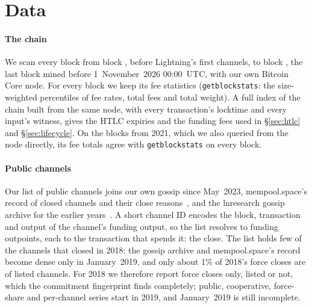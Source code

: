 \section{Data}
\label{sec:data}

\paragraph{The chain}
We scan every block from block \ScanStartHeight{}, before Lightning's first channels, to block \CutoffHeight{}, the last
block mined before 1~November~2026 00:00~UTC, with our own Bitcoin Core node. For every block we keep its fee
statistics (\texttt{getblockstats}: the size-weighted percentiles of fee rates, total fees and total weight). A full
index of the chain built from the same node, with every transaction's locktime and every input's witness, gives the
HTLC expiries and the funding fees used in \S\ref{sec:htlc} and \S\ref{sec:lifecycle}.
On the blocks from 2021, which we also queried from the node directly, its fee totals agree with
\texttt{getblockstats} on every block.

\paragraph{Public channels}
Our list of public channels joins our own gossip since May~2023, mempool.space's record of closed channels and their
close reasons~\cite{mempoolspace}, and the lnresearch gossip archive for the earlier
years~\cite{lnresearchtopology}. A short channel ID encodes the block, transaction and output of the channel's funding
output, so the list resolves to \NFundingOutpoints{} funding outpoints, each to the transaction that spends it: the
close. The list holds few of the channels that closed in 2018: the gossip archive and mempool.space's record become
dense only in January~2019, and only about 1\% of 2018's force closes are of listed channels. For 2018 we therefore
report force closes only, listed or not, which the commitment fingerprint finds completely; public, cooperative,
force-share and per-channel series start in 2019, and January~2019 is still incomplete.

